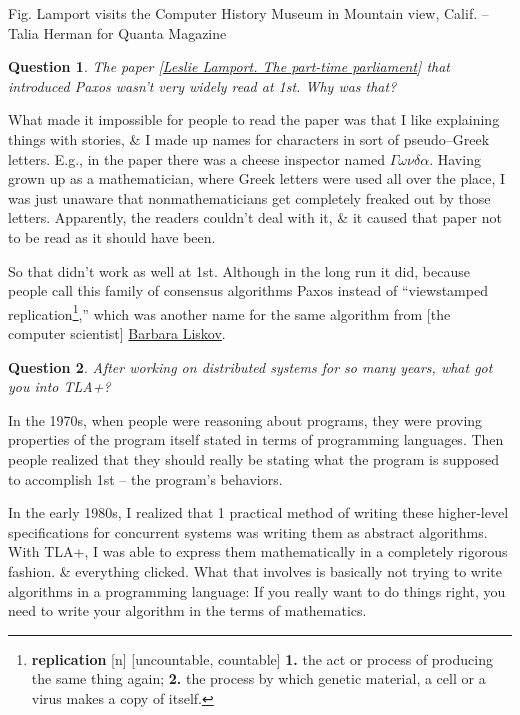 \documentclass[oneside]{book}
\numberwithin{equation}{section}
\newtheorem{question}{Question}[chapter]
\begin{document}
\textsf{Fig. Lamport visits the Computer History Museum in Mountain view, Calif.} -- Talia Herman for Quanta Magazine

\begin{question}
	The paper [\href{https://dl.acm.org/doi/10.1145/279227.279229}{Leslie Lamport. The part-time parliament}] that introduced Paxos wasn't very widely read at 1st. Why was that?
\end{question}
What made it impossible for people to read the paper was that I like explaining things with stories, \& I made up names for characters in sort of pseudo--Greek letters. E.g., in the paper there was a cheese inspector named $\Gamma\omega\nu\delta\alpha$. Having grown up as a mathematician, where Greek letters were used all over the place, I was just unaware that nonmathematicians get completely freaked out by those letters. Apparently, the readers couldn't deal with it, \& it caused that paper not to be read as it should have been.

So that didn't work as well at 1st. Although in the long run it did, because people call this family of consensus algorithms Paxos instead of ``viewstamped replication\footnote{\textbf{replication} [n] [uncountable, countable] \textbf{1.} the act or process of producing the same thing again; \textbf{2.} the process by which genetic material, a cell or a virus makes a copy of  itself.},'' which was another name for the same algorithm from [the computer scientist] \href{https://www.quantamagazine.org/barbara-liskov-is-the-architect-of-modern-algorithms-20191120/}{Barbara Liskov}.

\begin{question}
	After working on distributed systems for so many years, what got you into TLA+?
\end{question}
In the 1970s, when people were reasoning about programs, they were proving properties of the program itself stated in terms of programming languages. Then people realized that they should really be stating what the program is supposed to accomplish 1st -- the program's behaviors.

In the early 1980s, I realized that 1 practical method of writing these higher-level specifications for concurrent systems was writing them as abstract algorithms. With TLA+, I was able to express them mathematically in a completely rigorous fashion. \& everything clicked. What that involves is basically not trying to write algorithms in a programming language: If you really want to do things right, you need to write your algorithm in the terms of mathematics.
\end{document}
